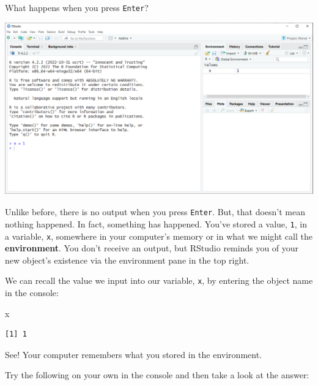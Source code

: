 \documentclass[
  letterpaper,
]{book}
\newenvironment{Shaded}{\begin{snugshade}}{\end{snugshade}}
\newcommand{\NormalTok}[1]{\textcolor[rgb]{0.00,0.23,0.31}{#1}}
\begin{document}
What happens when you press \texttt{Enter}?

\includegraphics{images/RStudio console_x1.png}

Unlike before, there is no output when you press \texttt{Enter}. But,
that doesn't mean nothing happened. In fact, something has happened.
You've stored a value, \texttt{1}, in a variable, \texttt{x}, somewhere
in your computer's memory or in what we might call the
\textbf{environment}. You don't receive an output, but RStudio reminds
you of your new object's existence via the environment pane in the top
right.

We can recall the value we input into our variable, \texttt{x}, by
entering the object name in the console:

\begin{Shaded}
\begin{Highlighting}[]
\NormalTok{x}
\end{Highlighting}
\end{Shaded}

\begin{verbatim}
[1] 1
\end{verbatim}

See! Your computer remembers what you stored in the environment.

Try the following on your own in the console and then take a look at the
answer:
\end{document}
